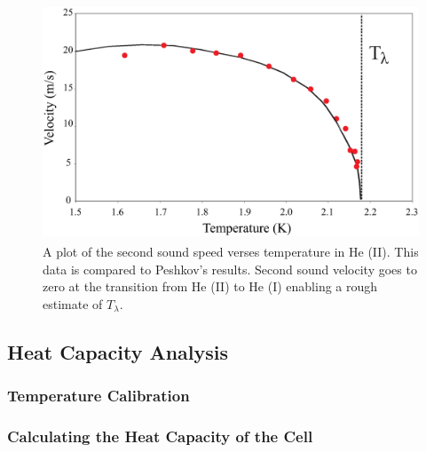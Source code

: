 \begin{figure}[htbp]
\begin{center}
\includegraphics[height=70mm]{./figures/secondsound.eps}
\caption{\small{A plot of the second sound speed verses temperature in He (II).  This data is compared to Peshkov's results.\cite{peshkov} Second sound velocity goes to zero at the transition from He (II) to He (I) enabling a rough estimate of $T_{\lambda}$.}}
\label{fig:secondsound}
\end{center}
\end{figure}


\subsection{Heat Capacity Analysis}\label{heatcapacityanalysis}
\subsubsection{Temperature Calibration}\label{temperaturecalibration}


\subsubsection{Calculating the Heat Capacity of the Cell}\label{calculatingtheheatcapacityofthecell}

